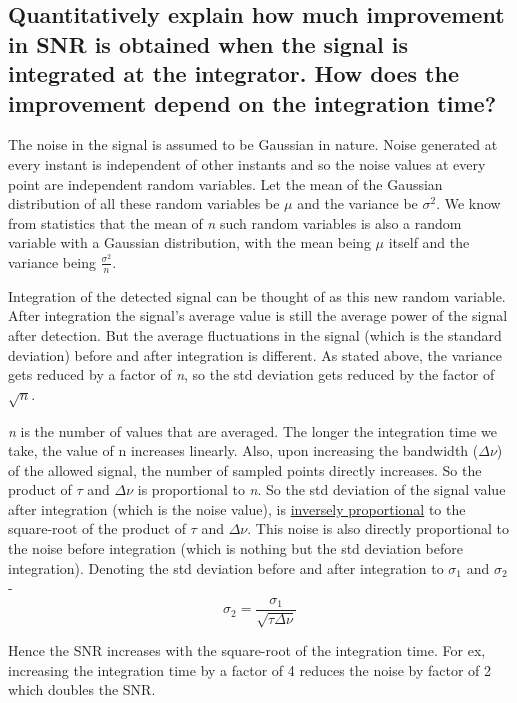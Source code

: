 \documentclass[12pt,a4paper, margin=3in]{article}
\begin{document}
\subsection*{Quantitatively explain how much improvement in SNR is obtained when the signal is integrated at the integrator. How does the improvement depend on the integration time?}

\large The noise in the signal is assumed to be Gaussian in nature. Noise generated at every instant is independent of other instants and so the noise values at every point are independent random variables. Let the mean of the Gaussian distribution of all these random variables be $\mu$ and the variance be $\sigma^2$. We know from statistics that the mean of \textit{n} such random variables is also a random variable with a Gaussian distribution, with the mean being $\mu$ itself and the variance being $\frac{\sigma^2}{n}$.

Integration of the detected signal can be thought of as this new random variable. After integration the signal's average value is still the average power of the signal after detection. But the average fluctuations in the signal (which is the standard deviation) before and after integration is different. As stated above, the variance gets reduced by a factor of \textit{n}, so the std deviation gets reduced by the factor of $\sqrt{n}$. 

\textit{n} is the number of values that are averaged. The longer the integration time we take, the value of n increases linearly. Also, upon increasing the bandwidth ($\Delta\nu$) of the allowed signal, the number of sampled points directly increases. So the product of $\tau$ and $\Delta\nu$ is proportional to \textit{n}. So the std deviation of the signal value after integration (which is the noise value), is \underline{inversely proportional} to the square-root of the product of $\tau$ and $\Delta\nu$. This noise is also directly proportional to the noise before integration (which is nothing but the std deviation before integration). Denoting the std deviation before and after integration to $\sigma_1$ and $\sigma_2$ - 
\begin{equation} \sigma_2 = \frac{\sigma_1}{\sqrt{\tau \Delta \nu}} \end{equation} 

Hence the SNR increases with the square-root of the integration time. For ex, increasing the integration time by a factor of 4 reduces the noise by factor of 2 which doubles the SNR.

\newpage
\end{document}
